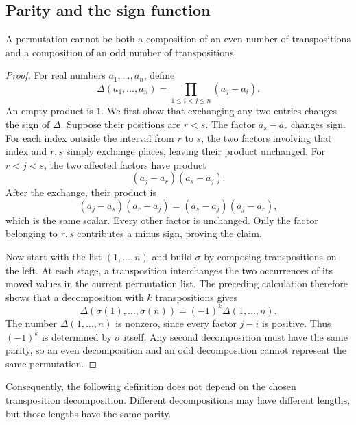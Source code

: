 \subsection{Parity and the sign function}

\begin{proposition}
  \label{thm:linear-algebra-i:permutation-parity}
  A permutation cannot be both a composition of an even number of
  transpositions and a composition of an odd number of transpositions.
\end{proposition}
\begin{pendingreview}
\begin{proof}
  For real numbers \(a_1,\ldots,a_n\), define
  \[
    \Delta(a_1,\ldots,a_n)=\prod_{1\leq i<j\leq n}(a_j-a_i).
  \]
  An empty product is \(1\). We first show that exchanging any two
  entries changes the sign of \(\Delta\). Suppose their positions are
  \(r<s\). The factor \(a_s-a_r\) changes sign. For each index
  outside the interval from \(r\) to \(s\), the two factors involving
  that index and \(r,s\) simply exchange places, leaving their product
  unchanged. For \(r<j<s\), the two affected factors have product
  \[
    (a_j-a_r)(a_s-a_j).
  \]
  After the exchange, their product is
  \[
    (a_j-a_s)(a_r-a_j)=(a_s-a_j)(a_j-a_r),
  \]
  which is the same scalar. Every other factor is unchanged. Only the
  factor belonging to \(r,s\) contributes a minus sign, proving the claim.

  Now start with the list \((1,\ldots,n)\) and build \(\sigma\) by
  composing transpositions on the left. At each stage, a transposition
  interchanges the two occurrences of its moved values in the current
  permutation list. The preceding calculation therefore shows that a
  decomposition with \(k\) transpositions gives
  \[
    \Delta(\sigma(1),\ldots,\sigma(n))
      =(-1)^k\Delta(1,\ldots,n).
  \]
  The number \(\Delta(1,\ldots,n)\) is nonzero, since every factor
  \(j-i\) is positive. Thus \((-1)^k\) is determined by \(\sigma\)
  itself. Any second decomposition must have the same parity, so an even
  decomposition and an odd decomposition cannot represent the same permutation.
\end{proof}
\end{pendingreview}

Consequently, the following definition does not depend on the chosen
transposition decomposition. Different decompositions may have different
lengths, but those lengths have the same parity.

